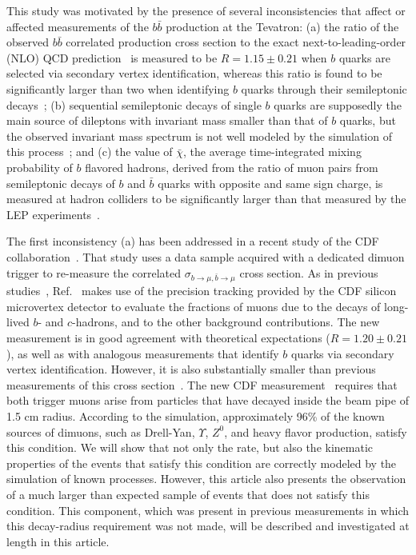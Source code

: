 \documentclass[aps,prd,preprint,floatfix,nofootinbib,superscriptaddress,showpacs,amssymb]{revtex4}
\begin{document}
 This study was  motivated by the presence of several inconsistencies that
 affect or affected measurements of the $b\bar{b}$ production at the Tevatron:
 (a) the ratio of the observed  $b\bar{b}$ correlated production cross
 section to the exact next-to-leading-order (NLO) QCD prediction~\cite{mnr}
 is measured to be $R=1.15 \pm 0.21 $ when  $b$ quarks are selected via 
 secondary vertex identification, whereas this ratio is found to be
 significantly larger than two when identifying $b$ quarks through their
 semileptonic decays~\cite{bstatus}; (b) sequential semileptonic decays
 of single $b$ quarks are supposedly the main source of dileptons with
 invariant mass smaller than that of $b$ quarks, but the observed invariant
 mass spectrum is not well modeled by the simulation of this
 process~\cite{dilb}; and (c) the value of $\bar{\chi}$, the average
 time-integrated mixing probability of $b$ flavored hadrons, derived from
 the ratio of muon pairs from semileptonic decays of $b$ and $\bar{b}$
 quarks with opposite and same sign charge, is measured at hadron colliders
 to be significantly larger than that measured by the LEP 
 experiments~\cite{bmix,pdg}.
 
 The first inconsistency (a) has been addressed in a recent study
 of the CDF collaboration~\cite{bbxs}. That study uses a data sample
 acquired with a dedicated dimuon trigger to re-measure the correlated  
 $\sigma_{b\rightarrow\mu,\bar{b}\rightarrow \mu}$ cross section. As in
 previous studies~\cite{2mucdf,bmix}, Ref.~\cite{bbxs} makes use of the
 precision tracking provided by the CDF silicon microvertex detector to
 evaluate the fractions of muons due to the decays of long-lived $b$- 
 and $c$-hadrons, and to the other background contributions. The new 
 measurement is in good agreement with theoretical expectations
($R=1.20 \pm 0.21$), as well as
 with analogous measurements that identify $b$ quarks via secondary vertex
 identification. However, it is also substantially smaller than previous
 measurements of this cross section~\cite{2mucdf,d0b2}.
 The new
 CDF measurement~\cite{bbxs} requires that both trigger muons arise from
 particles that have decayed inside the beam pipe of 1.5 cm radius. According
 to the simulation, approximately 96\% of the known sources of dimuons, 
 such as Drell-Yan, $\Upsilon$, $Z^0$, and heavy flavor production, satisfy
 this condition. We will show that not only the rate, but also the kinematic
 properties of the events that satisfy this condition are correctly modeled
 by the simulation of known processes. However, this article also presents
 the observation of a much larger than expected sample of events that does
 not satisfy this condition. This component, which was present in previous
 measurements in which this decay-radius requirement was not made, will be
 described and investigated at length in this article.
\end{document}
